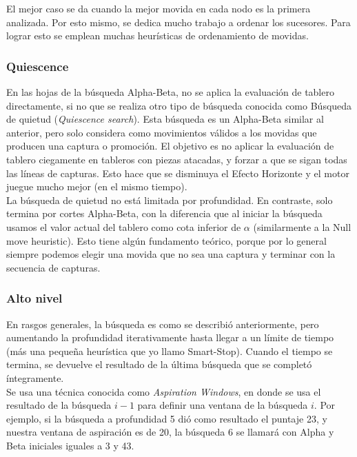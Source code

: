 \documentclass{article}
\begin{document}

El mejor caso se da cuando la mejor movida en cada nodo es la
primera analizada. Por esto mismo, se dedica mucho trabajo a ordenar
los sucesores. Para lograr esto se emplean muchas heurísticas de
ordenamiento de movidas.
\\

\subsubsection{Quiescence}

En las hojas de la búsqueda Alpha-Beta, no se aplica la evaluación
de tablero directamente, si no que se realiza otro tipo de búsqueda
conocida como Búsqueda de quietud (\emph{Quiescence search}). Esta
búsqueda es un Alpha-Beta similar al anterior, pero solo considera
como movimientos válidos a los movidas que producen una captura
o promoción. El objetivo es no aplicar la evaluación de tablero
ciegamente en tableros con piezas atacadas, y forzar a que se sigan
todas las líneas de capturas. Esto hace que se disminuya el Efecto
Horizonte y el motor juegue mucho mejor (en el mismo tiempo).
\\

La búsqueda de quietud no está limitada por profundidad. En contraste,
solo termina por cortes Alpha-Beta, con la diferencia que al iniciar
la búsqueda usamos el valor actual del tablero como cota inferior de
$\alpha$ (similarmente a la Null move heuristic). Esto tiene algún
fundamento teórico, porque por lo general siempre podemos elegir una
movida que no sea una captura y terminar con la secuencia de capturas.
\\

\subsubsection{Alto nivel}

En rasgos generales, la búsqueda es como se describió anteriormente,
pero aumentando la profundidad iterativamente hasta llegar a un límite
de tiempo (más una pequeña heurística que yo llamo Smart-Stop).
Cuando el tiempo se termina, se devuelve el resultado de la última
búsqueda que se completó íntegramente.
\\

Se usa una técnica conocida como \emph{Aspiration Windows}, en donde se
usa el resultado de la búsqueda $i - 1$ para definir una ventana de la
búsqueda $i$. Por ejemplo, si la búsqueda a profundidad 5 dió como
resultado el puntaje 23, y nuestra ventana de aspiración es de 20, la
búsqueda 6 se llamará con Alpha y Beta iniciales iguales a 3 y 43.
\\
\end{document}
